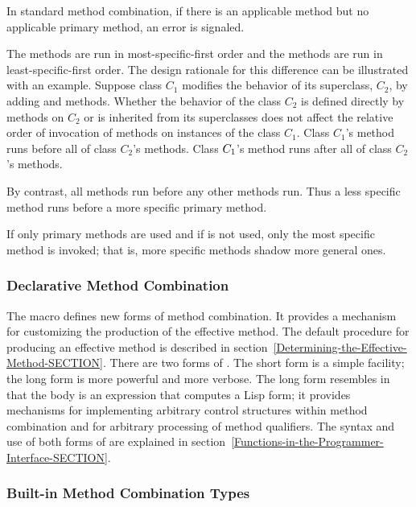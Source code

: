 In standard method combination, if there is an applicable method
but no applicable primary method, an error is signaled.

The  methods are run in most-specific-first order and
the  methods are run in least-specific-first order.  The
design rationale for this difference can be illustrated with an
example.  Suppose class $C _1$ modifies the behavior of its
superclass, $C _2$, by adding  and 
methods. Whether the behavior of the class $C_2$ is defined
directly by methods on $C_2$ or is inherited from its superclasses
does not affect the relative order of invocation of methods on
instances of the class $C_1$.  Class $C _1$'s 
method runs before all of class $C _2$'s methods.  Class $C _
1$'s  method runs after all of class $C _2$'s methods.

By contrast, all  methods run before any other methods
run.  Thus a less specific  method runs before a more
specific primary method.

If only primary methods are used and if  is not
used, only the most specific method is invoked; that is, more specific
methods shadow more general ones. 

\subsubsection{Declarative Method Combination}

The macro  defines new forms of method
combination.  It provides a mechanism for customizing the production
of the effective method. The default procedure for producing an
effective method is described in
section~\ref{Determining-the-Effective-Method-SECTION}.
There are two forms of 
.  The short form is a simple facility;
the long form is more powerful and more verbose.  The long form
resembles  in that the body is an expression that
computes a Lisp form; it provides mechanisms for implementing
arbitrary control structures within method combination and for
arbitrary processing of method qualifiers.  The syntax and use of both
forms of  are explained in
section~\ref{Functions-in-the-Programmer-Interface-SECTION}.


\subsubsection{Built-in Method Combination Types}
\label{Built-in-Method-Combination-Types-SECTION}

